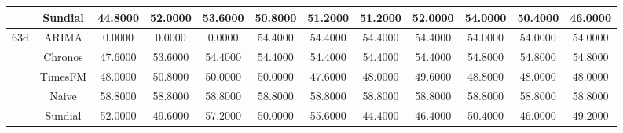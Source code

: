 \begin{table}[H]
{\begin{tabular}{cccccccccccc}
 & Sundial & 44.8000 & 52.0000 & 53.6000 & 50.8000 & 51.2000 & 51.2000 & 52.0000 & 54.0000 & 50.4000 & 46.0000 \\
\midrule
\multirow[c]{5}{*}{63d} & ARIMA & 0.0000 & 0.0000 & 0.0000 & 54.4000 & 54.4000 & 54.4000 & 54.4000 & 54.0000 & 54.0000 & 54.0000 \\
 & Chronos & 47.6000 & 53.6000 & 54.4000 & 54.4000 & 54.4000 & 54.4000 & 54.4000 & 54.8000 & 54.8000 & 54.8000 \\
 & TimesFM & 48.0000 & 50.8000 & 50.0000 & 50.0000 & 47.6000 & 48.0000 & 49.6000 & 48.8000 & 48.0000 & 48.0000 \\
 & Naive & 58.8000 & 58.8000 & 58.8000 & 58.8000 & 58.8000 & 58.8000 & 58.8000 & 58.8000 & 58.8000 & 58.8000 \\
 & Sundial & 52.0000 & 49.6000 & 57.2000 & 50.0000 & 55.6000 & 44.4000 & 46.4000 & 50.4000 & 46.0000 & 49.2000 \\
\bottomrule
\end{tabular}

 }
\end{table}